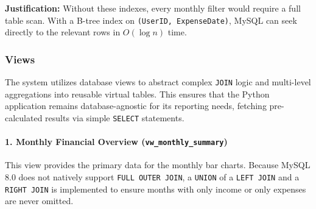 \documentclass[12pt, a4paper]{article}
\begin{document}
\textbf{Justification:} Without these indexes, every monthly filter would require a
full table scan. With a B-tree index on \texttt{(UserID, ExpenseDate)}, MySQL can seek
directly to the relevant rows in $O(\log n)$ time.

\subsubsection{Views}

The system utilizes database views to abstract complex \texttt{JOIN} logic and
multi-level aggregations into reusable virtual tables. This ensures that the Python
application remains database-agnostic for its reporting needs, fetching pre-calculated
results via simple \texttt{SELECT} statements.

\paragraph{1. Monthly Financial Overview (\texttt{vw\_monthly\_summary})}

This view provides the primary data for the monthly bar charts. Because MySQL 8.0 does
not natively support \texttt{FULL OUTER JOIN}, a \texttt{UNION} of a \texttt{LEFT JOIN}
and a \texttt{RIGHT JOIN} is implemented to ensure months with only income or only
expenses are never omitted.
\end{document}
